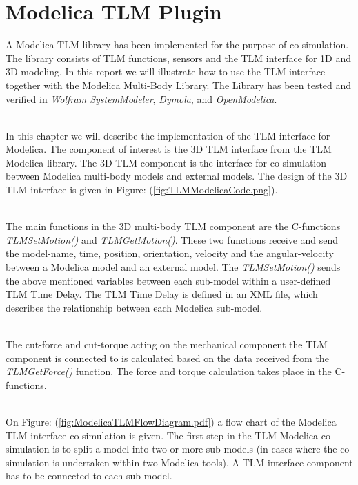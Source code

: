\chapter{Modelica TLM Plugin}
A Modelica TLM library has been implemented for the purpose of co-simulation. The library consists of TLM functions, sensors and the TLM interface for 1D and 3D modeling. In this report we will illustrate how to use the TLM interface together with the Modelica Multi-Body Library. The Library has been tested and verified in \emph{Wolfram SystemModeler}, \emph{Dymola}, and \emph{OpenModelica}.


~\\In this chapter we will describe the implementation of the TLM interface for Modelica. The component of interest is the 3D TLM interface from the TLM Modelica library. The 3D TLM component is the interface for co-simulation between Modelica multi-body models and external models. The design of the 3D TLM interface is given in Figure: (\ref{fig:TLMModelicaCode.png}).~\\


~\\The main functions in the 3D multi-body TLM component are the C-functions \emph{TLMSetMotion()} and \emph{TLMGetMotion()}. These two functions receive and send the model-name, time, position, orientation, velocity and the angular-velocity between a Modelica model and an external model. The \emph{TLMSetMotion()} sends the above mentioned variables between each sub-model within a user-defined TLM Time Delay. The TLM Time Delay is defined in an XML file, which describes the relationship between each Modelica sub-model.

~\\The cut-force and cut-torque acting on the mechanical component the TLM component is connected to is calculated based on the data received from the \emph{TLMGetForce()} function. The force and torque calculation takes place in the C-functions.


~\\On Figure: (\ref{fig:ModelicaTLMFlowDiagram.pdf}) a flow chart of the Modelica TLM interface co-simulation is given. The first step in the TLM Modelica co-simulation is to split a model into two or more sub-models (in cases where the co-simulation is undertaken within two Modelica tools). A TLM interface component has to be connected to each sub-model.

